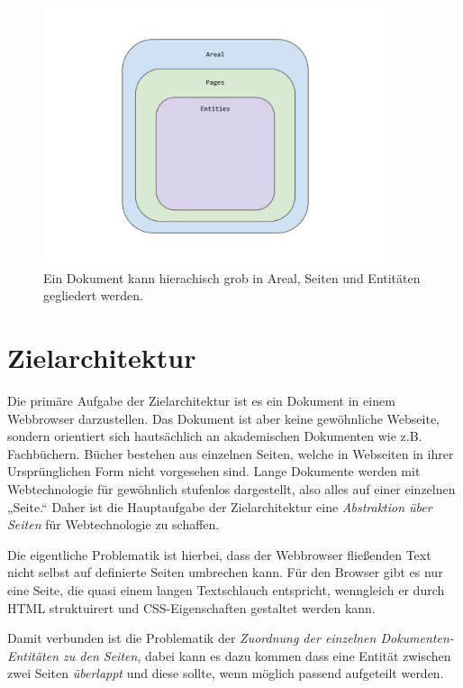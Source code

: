 \begin{figure}[h!]
  \centering
    \includegraphics[width=0.9\textwidth]{figures/areal_pages_entities.pdf}
  \caption{Ein Dokument kann hierachisch grob in Areal, Seiten und Entitäten gegliedert werden.}\label{fig-areal_pages_entities}
\end{figure}

\section{Zielarchitektur}\label{sec-zielarchitektur}

Die primäre Aufgabe der Zielarchitektur ist es ein Dokument in
einem Webbrowser darzustellen. Das Dokument ist aber keine gewöhnliche
Webseite, sondern orientiert sich hautsächlich an akademischen
Dokumenten wie z.B. Fachbüchern. Bücher bestehen aus einzelnen Seiten,
welche in Webseiten in ihrer Ursprünglichen Form nicht vorgesehen sind.
Lange Dokumente werden mit Webtechnologie für gewöhnlich stufenlos
dargestellt, also alles auf einer einzelnen „Seite.“
Daher ist die Hauptaufgabe der Zielarchitektur eine \emph{Abstraktion
über Seiten} für Webtechnologie zu schaffen.

Die eigentliche Problematik ist hierbei, dass der Webbrowser fließenden
Text nicht selbst auf definierte Seiten umbrechen kann. Für den Browser
gibt es nur eine Seite, die quasi einem langen Textschlauch entspricht,
wenngleich er durch HTML struktuirert und
CSS-Eigenschaften gestaltet werden kann.

Damit verbunden ist die Problematik der
\emph{Zuordnung der einzelnen Dokumenten-Entitäten zu den Seiten},
dabei kann es dazu kommen dass eine Entität zwischen zwei Seiten
\emph{überlappt} und diese sollte, wenn möglich passend aufgeteilt werden.

